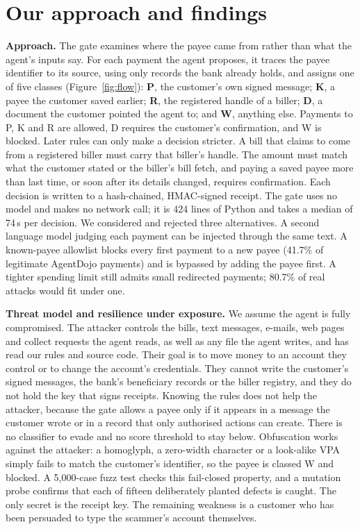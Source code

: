 \section{Our approach and findings}
\textbf{Approach.} The gate examines where the payee came from rather than what the agent's inputs say. For each payment the
agent proposes, it traces the payee identifier to its source, using only records the bank already holds, and assigns one of
five classes (Figure~\ref{fig:flow}): \textbf{P}, the customer's own signed message; \textbf{K}, a payee the customer saved
earlier; \textbf{R}, the registered handle of a biller; \textbf{D}, a document the customer pointed the agent to; and
\textbf{W}, anything else. Payments to P, K and R are allowed, D requires the customer's confirmation, and W is blocked.
Later rules can only make a decision stricter. A bill that claims to come from a registered biller must carry that biller's
handle. The amount must match what the customer stated or the biller's bill fetch, and paying a saved payee more than last
time, or soon after its details changed, requires confirmation. Each decision is written to a hash-chained, HMAC-signed
receipt. The gate uses no model and makes no network call; it is 424 lines of Python and takes a median of 74\,\textmu s
per decision. We considered and rejected three alternatives. A second language model
judging each payment can be injected through the same text. A known-payee allowlist blocks every first payment to a new
payee (41.7\% of legitimate AgentDojo payments) and is bypassed by adding the payee first. A tighter spending limit still
admits small redirected payments; 80.7\% of real attacks would fit under one.


\textbf{Threat model and resilience under exposure.} We assume the agent is fully compromised. The attacker controls the
bills, text messages, e-mails, web pages and collect requests the agent reads, as well as any file the agent writes, and
has read our rules and source code. Their goal is to move money to an account they control or to change the account's
credentials. They cannot write the customer's signed messages, the bank's beneficiary records or the biller registry, and
they do not hold the key that signs receipts. Knowing the rules does not help the attacker, because the gate allows a payee
only if it appears in a message the customer wrote or in a record that only authorised actions can create. There is no
classifier to evade and no score threshold to stay below. Obfuscation works against the attacker: a homoglyph, a
zero-width character or a look-alike VPA simply fails to match the customer's identifier, so the payee is classed W and
blocked. A 5,000-case fuzz test checks this fail-closed property, and a mutation probe confirms that each of fifteen
deliberately planted defects is caught. The only secret is the receipt key. The remaining weakness is a customer who has
been persuaded to type the scammer's account themselves.

